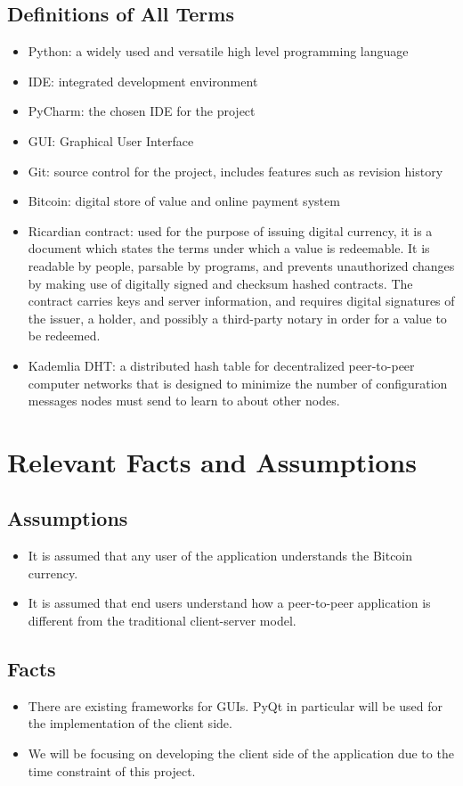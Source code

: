 \documentclass{article}
\begin{document}
\subsection{Definitions of All Terms}
\begin{itemize}
        
\item
Python: a widely used and versatile high level programming language
\item
IDE: integrated development environment
\item
PyCharm: the chosen IDE for the project 
\item
GUI: Graphical User Interface
\item
Git: source control for the project, includes features such as revision history
\item
Bitcoin: digital store of value and online payment system
\item
Ricardian contract: used for the purpose of issuing digital currency, it is a document which states the terms under which a value is redeemable. It is readable by people, parsable by programs, and prevents unauthorized changes by making use of digitally signed and checksum hashed contracts. The contract carries keys and server information, and requires digital signatures of the issuer, a holder, and possibly a third-party notary in order for a value to be redeemed.
\item
Kademlia DHT: a distributed hash table for decentralized peer-to-peer computer networks that is designed to minimize the number of configuration messages nodes must send to learn to about other nodes.
\end{itemize}
\section{Relevant Facts and Assumptions}
\subsection{Assumptions}
\begin{itemize}
        
\item
It is assumed that any user of the application understands the Bitcoin currency.
\item
It is assumed that end users understand how a peer-to-peer application is different from the traditional client-server model.
\end{itemize}
\subsection{Facts}
\begin{itemize}
        
\item
There are existing frameworks for GUIs. PyQt in particular will be used for the implementation of the client side. 
\item
We will be focusing on developing the client side of the application due to the time constraint of this project.
        
\end{itemize} 
\end{document}
